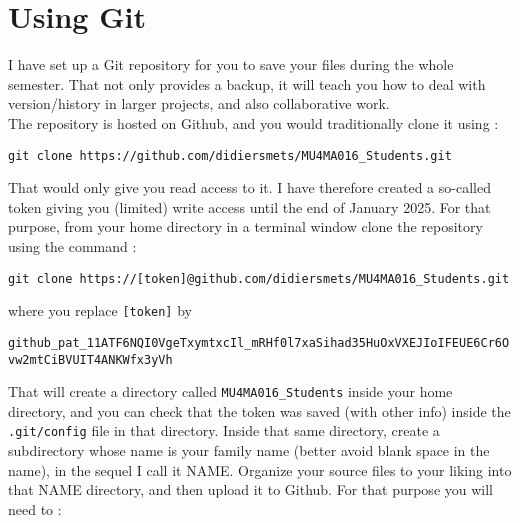 \documentclass[a4paper,12pt]{article}
\begin{document}
\section{Using Git}
I have set up a Git repository for you to save your files during the whole
semester. That not only provides a backup, it will teach you how to deal with
version/history in larger projects, and also collaborative work.\\
The repository is hosted on Github, and you would traditionally clone it
using :
\begin{center}
{\tt git clone https://github.com/didiersmets/MU4MA016\_Students.git} 
\end{center}
That would only give you read access to it. I have therefore created a so-called token 
giving you (limited) write access until the end of January 2025. For that purpose, from 
your home directory in a terminal window clone the repository using 
the command :
\begin{center}
	{\tt git clone https://[token]@github.com/didiersmets/MU4MA016\_Students.git} 
\end{center}
where you replace {\tt [token]} by 
\begin{center}
	{\tt \scriptsize github\_pat\_11ATF6NQI0VgeTxymtxcIl\_mRHf0l7xaSihad35HuOxVXEJIoIFEUE6Cr6Ovw2mtCiBVUIT4ANKWfx3yVh}
\end{center}
That will create a directory called {\tt MU4MA016\_Students} inside your home
directory, and you can check that the token was saved (with other info) 
inside the {\tt .git/config} file in that directory. Inside that same directory, 
create a subdirectory whose name is your family name (better avoid blank space 
in the name), in the sequel I call it NAME. Organize your source files to your 
liking into that NAME directory, and then upload it to Github. For that purpose 
you will need to :
\end{document}
